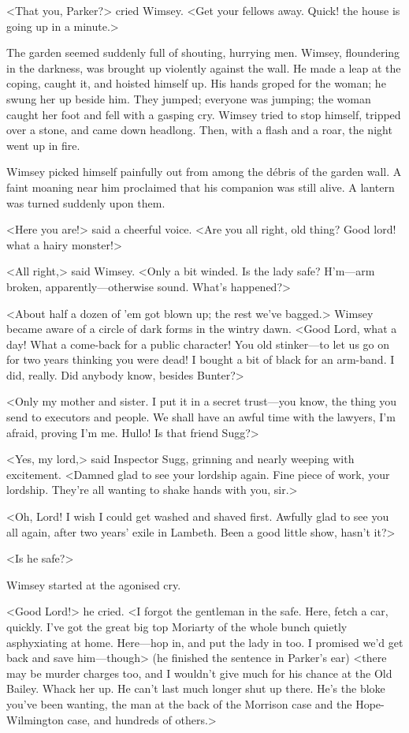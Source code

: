 <That you, Parker?> cried Wimsey. <Get your fellows away. Quick! the house is going up in a minute.>

The garden seemed suddenly full of shouting, hurrying men. Wimsey, floundering in the darkness, was brought up violently against the wall. He made a leap at the coping, caught it, and hoisted himself up. His hands groped for the woman; he swung her up beside him. They jumped; everyone was jumping; the woman caught her foot and fell with a gasping cry. Wimsey tried to stop himself, tripped over a stone, and came down headlong. Then, with a flash and a roar, the night went up in fire.

Wimsey picked himself painfully out from among the débris of the garden wall. A faint moaning near him proclaimed that his companion was still alive. A lantern was turned suddenly upon them.

<Here you are!> said a cheerful voice. <Are you all right, old thing? Good lord! what a hairy monster!>

<All right,> said Wimsey. <Only a bit winded. Is the lady safe? H'm—arm broken, apparently—otherwise sound. What's happened?>

<About half a dozen of 'em got blown up; the rest we've bagged.> Wimsey became aware of a circle of dark forms in the wintry dawn. <Good Lord, what a day! What a come-back for a public character! You old stinker—to let us go on for two years thinking you were dead! I bought a bit of black for an arm-band. I did, really. Did anybody know, besides Bunter?>

<Only my mother and sister. I put it in a secret trust—you know, the thing you send to executors and people. We shall have an awful time with the lawyers, I'm afraid, proving I'm me. Hullo! Is that friend Sugg?>

<Yes, my lord,> said Inspector Sugg, grinning and nearly weeping with excitement. <Damned glad to see your lordship again. Fine piece of work, your lordship. They're all wanting to shake hands with you, sir.>

<Oh, Lord! I wish I could get washed and shaved first. Awfully glad to see you all again, after two years' exile in Lambeth. Been a good little show, hasn't it?>

<Is he safe?>

Wimsey started at the agonised cry.

<Good Lord!> he cried. <I forgot the gentleman in the safe. Here, fetch a car, quickly. I've got the great big top Moriarty of the whole bunch quietly asphyxiating at home. Here—hop in, and put the lady in too. I promised we'd get back and save him—though> (he finished the sentence in Parker's ear) <there may be murder charges too, and I wouldn't give much for his chance at the Old Bailey. Whack her up. He can't last much longer shut up there. He's the bloke you've been wanting, the man at the back of the Morrison case and the Hope-Wilmington case, and hundreds of others.>

